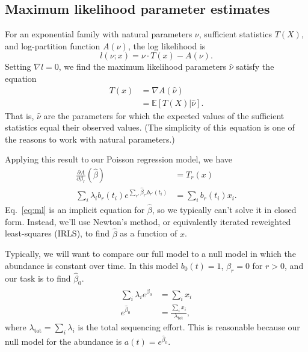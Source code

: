 \documentclass[12pt, letterpaper]{article}
\newcommand{ \lambtot }{\lambda_{\text{tot}}}
\begin{document}
\subsection{Maximum likelihood parameter estimates}

For an exponential family with natural parameters $\nu$, sufficient statistics $T(X)$, and log-partition function $A(\nu)$, the log likelihood is
\begin{equation}
    l(\nu; x) = \nu \cdot T(x) - A(\nu).
\end{equation}
Setting $\nabla l = 0$, we find the maximum likelihood parameters $\hat{\nu}$ satisfy the equation
\begin{align}
    T(x) &= \nabla A(\hat{\nu}) \\
         &= \mathbb{E}\left[T(X)|\hat{\nu}\right].
\end{align}
That is, $\hat{\nu}$ are the parameters for which the expected values of the sufficient statistics equal their observed values.
(The simplicity of this equation is one of the reasons to work with natural parameters.)

Applying this result to our Poisson regression model, we have
\begin{align}
    \frac{\partial A}{\partial \beta_r}(\hat{\beta}) &= T_r(x) \\
    \sum_i \lambda_i b_r(t_i) e^{\sum_{r'} \hat{\beta}_{r'} b_{r'}(t_i)}
                                                     &= \sum_i b_r(t_i) x_i.
    \label{eq:ml}
\end{align}
Eq.~\ref{eq:ml} is an implicit equation for $\hat{\beta}$, so we typically can't solve it in closed form.
Instead, we'll use Newton's method, or equivalently iterated reweighted least-squares (IRLS), to find $\hat{\beta}$ as a function of $x$.

Typically, we will want to compare our full model to a null model in which the abundance is constant over time.
In this model $b_0(t) = 1$, $\beta_r = 0$ for $r > 0$, and our task is to find $\hat{\beta}_0$.
\begin{align}
    \sum_i \lambda_i e^{\hat{\beta}_0} &= \sum_i x_i \\
    e^{\hat{\beta}_0} &= \frac{\sum_i x_i}{\lambtot},
\end{align}
where $\lambtot = \sum_i \lambda_i$ is the total sequencing effort.
This is reasonable because our null model for the abundance is $a(t) = e^{\hat{\beta}_0}$.
\end{document}
